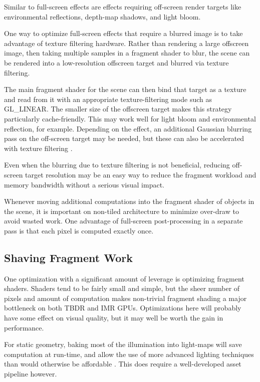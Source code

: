 Similar to full-screen effects are effects requiring off-screen render targets
like environmental reflections, depth-map shadows, and light bloom.

One way to optimize full-screen effects that require a blurred image is to take
advantage of texture filtering hardware.  Rather than rendering a large
offscreen image, then taking multiple samples in a fragment shader to blur, the
scene can be rendered into a low-resolution offscreen target and blurred via
texture filtering.

The main fragment shader for the scene can then bind that target as a texture
and read from it with an appropriate texture-filtering mode such as GL\_LINEAR.
The smaller size of the offscreen target makes this strategy particularly
cache-friendly.  This may work well for light bloom and environmental
reflection, for example.  Depending on the effect, an additional Gaussian
blurring pass on the off-screen target may be needed, but these can also be
accelerated with texture filtering \cite{Rideout}.

Even when the blurring due to texture filtering is not beneficial, reducing
off-screen target resolution may be an easy way to reduce the fragment workload
and memory bandwidth without a serious visual impact.

Whenever moving additional computations into the fragment shader of objects in
the scene, it is important on non-tiled architecture to minimize over-draw to
avoid wasted work.  One advantage of full-screen post-processing in a separate
pass is that each pixel is computed exactly once.

\subsection{Shaving Fragment Work}
\label{Jon-McCaffrey-Shaving-Fragment-Work}

One optimization with a significant amount of leverage is optimizing fragment
shaders.  Shaders tend to be fairly small and simple, but the sheer number of
pixels and amount of computation makes non-trivial fragment shading a major
bottleneck on both TBDR and IMR GPUs.  Optimizations here will probably have
some effect on visual quality, but it may well be worth the gain in
performance.

For static geometry, baking most of the illumination into light-maps will save
computation at run-time, and allow the use of more advanced lighting techniques
than would otherwise be affordable \cite{Miller99} \cite{Unity11}.
This does require a well-developed asset pipeline however.

